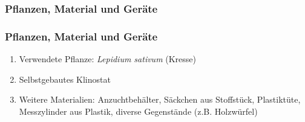 \documentclass[aspectratio=169
]{beamer}
\begin{document}
	\subsubsection{Pflanzen, Material und Geräte}

	\begin{frame}[<+(1)->]
		\frametitle{Pflanzen, Material und Geräte}
\begin{enumerate}
\item Verwendete Pflanze: \protect\emph{Lepidium sativum} (Kresse)
\item Selbstgebautes Klinostat
\item Weitere Materialien: Anzuchtbehälter, Säckchen aus Stoffstück, Plastiktüte, Messzylinder aus Plastik, diverse Gegenstände (z.B. Holzwürfel)
\end{enumerate} 
	\end{frame}
\end{document}
